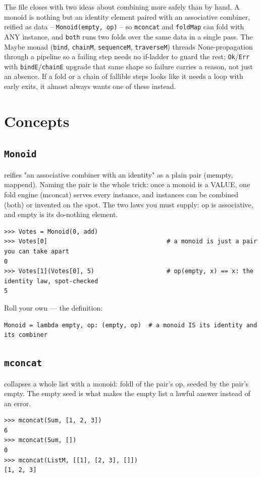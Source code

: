 \documentclass[10pt,letterpaper]{book}
\begin{document}
The file closes with two ideas about combining more safely than by hand. A
monoid is nothing but an identity element paired with an associative
combiner, reified as data -- \texttt{Monoid(empty, op)} -- so \texttt{mconcat}
and \texttt{foldMap} can fold with ANY instance, and \texttt{both} runs two
folds over the same data in a single pass. The Maybe monad
(\texttt{bind}, \texttt{chainM}, \texttt{sequenceM}, \texttt{traverseM})
threads None-propagation through a pipeline so a failing step needs no
if-ladder to guard the rest; \texttt{Ok}/\texttt{Err} with
\texttt{bindE}/\texttt{chainE} upgrade that same shape so failure carries a
reason, not just an absence. If a fold or a chain of fallible steps looks
like it needs a loop with early exits, it almost always wants one of
these instead.
\section{Concepts}
\subsection{\texttt{Monoid}}\label{def:Monoid}
reifies "an associative combiner with an identity" as a plain pair (mempty, mappend). Naming the pair is the whole trick: once a monoid is a VALUE, one fold engine (mconcat) serves every instance, and instances can be combined (both) or invented on the spot. The two laws you must supply: op is associative, and empty is its do-nothing element.
\begin{lstlisting}[style=ex]
>>> Votes = Monoid(0, add)
>>> Votes[0]                                 # a monoid is just a pair you can take apart
0
>>> Votes[1](Votes[0], 5)                    # op(empty, x) == x: the identity law, spot-checked
5
\end{lstlisting}

Roll your own --- the definition:

\begin{lstlisting}[style=ex]
Monoid = lambda empty, op: (empty, op)  # a monoid IS its identity and its combiner
\end{lstlisting}
\subsection{\texttt{mconcat}}\label{def:mconcat}
collapses a whole list with a monoid: foldl of the pair's op, seeded by the pair's empty. The empty seed is what makes the empty list a lawful answer instead of an error.
\begin{lstlisting}[style=ex]
>>> mconcat(Sum, [1, 2, 3])
6
>>> mconcat(Sum, [])
0
>>> mconcat(ListM, [[1], [2, 3], []])
[1, 2, 3]
\end{lstlisting}
\end{document}
